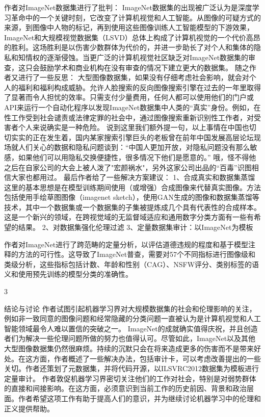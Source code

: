 作者对ImageNet数据集进行了批判：
ImageNet数据集的出现被广泛认为是深度学习革命中的一个关键时刻，它改变了计算机视觉和人工智能。从图像的可疑方式的来源，到图像中人物的标记，再到使用这些图像训练人工智能模型的下游效果，ImageNet和大规模视觉数据集（LSVD）总体上构成了计算机视觉的一个代价高昂的胜利。这场胜利是以伤害少数群体为代价的，并进一步助长了对个人和集体的隐私和知情权的逐渐侵蚀。当更广泛的计算机视觉社区缺乏对ImageNet数据集的审查，这只会鼓励学术和商业机构在没有审查的情况下建立更大的数据集。
随之作者又进行了一些反思：
大型图像数据集，如果没有仔细考虑社会影响，就会对个人的福利和福利构成威胁。允许人脸搜索的反向图像搜索引擎在过去的一年里取得了显著而令人担忧的效率。只需支付少量费用，任何人都可以使用他们的门户或API来运行一个自动化程序以发现ImageNet数据集中人类的“真实”身份。例如，在性工作受到社会谴责或法律定罪的社会中，通过图像搜索重新识别性工作者，对受害者个人来说确实是一种危险。
说到这里我们额外提一句，以上事情在中国也切切实实的正在发生着，国内某家搜索引擎巨头的老板曾在前年中国发展高层论坛现场就人们关心的数据和隐私问题谈到：“中国人更加开放，对隐私问题没有那么敏感，如果他们可以用隐私交换便捷性，很多情况下他们是愿意的。”
哦，怪不得他之后在自家公司的大会上被人泼了"宏颜祸水"，另外这家公司出品的“百毒”识图相信大家也都用过。
最后作者给了一些解决方案建议：
1、合成真实和数据集蒸馏
这里的基本思想是在模型训练期间使用（或增强）合成图像来代替真实图像。方法包括使用手绘草图图像（imagenet sketch），使用GAN生成的图像和数据集蒸馏等技术，其中一个数据集或一个数据集的子集被提炼成几个具有代表性的合成样本。这是一个新兴的领域，在跨视觉域的无监督域适应和通用数字分类方面有一些有希望的结果。
2、对数据集强化伦理过滤
3、定量数据集审计：以ImageNet为模板
      
作者对ImageNet进行了跨范畴的定量分析，以评估道德违规的程度和基于模型注释的方法的可行性。这导致了ImageNet普查，需要对57个不同指标进行图像级和类级分析，这些指标包括计数、年龄和性别（CAG）、NSFW评分、类别标签的语义和使用预先训练的模型分类的准确性。
 
3


结论与讨论
作者试图引起机器学习界对大规模数据集的社会和伦理影响的关注，例如非一致同意的图像问题和经常隐藏的分类问题一直被认为是计算机视觉和人工智能领域最令人难以置信的突破之一。
ImageNet的成就确实值得庆祝，并且创造者们为解决一些伦理问题所做的努力也值得认可。尽管如此，ImageNet以及其他大型图像数据集仍然很麻烦。持续的沉默只会在将来造成更多的伤害而不是带来好处。在这方面，作者概述了一些解决办法，包括审计卡，可以考虑改善提出的一些关切。作者还策划了元数据集，并将代码开源，以ILSVRC2012数据集为模板进行定量审计。
作者敦促机器学习界密切关注他们的工作对社会，特别是对弱势群体的直接和间接影响。在这方面，必须意识到当前工作的历史前因、背景和政治层面。作者希望这项工作有助于提高人们的意识，并为继续讨论机器学习中的伦理和正义提供帮助。
 
